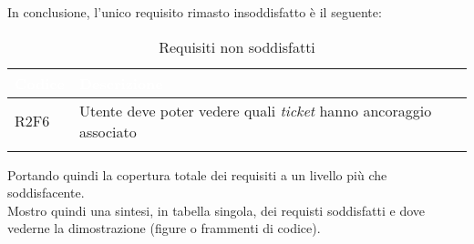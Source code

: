 In conclusione, l'unico requisito rimasto insoddisfatto è il seguente:

{
    \setlength{\freewidth}{\dimexpr\textwidth-10\tabcolsep}
    \renewcommand{\arraystretch}{1.5}
    \centering
    \setlength{\aboverulesep}{0pt}
    \setlength{\belowrulesep}{0pt}
    \begin{longtable}{C{.15\freewidth} C{.965\freewidth}} 
       \toprule
    \textcolor{white}{\textbf{Codice}}&
    \textcolor{white}{\textbf{Descrizione}}\\
    \toprule
    \endhead

    R2F6 & Utente deve poter vedere quali \textit{ticket} hanno ancoraggio associato\\

    \bottomrule
    \caption{Requisiti non soddisfatti}
    \end{longtable}
}

Portando quindi la copertura totale dei requisiti a un livello più che soddisfacente.\\
Mostro quindi una sintesi, in tabella singola, dei requisti soddisfatti e dove vederne la dimostrazione (figure o frammenti di codice).

